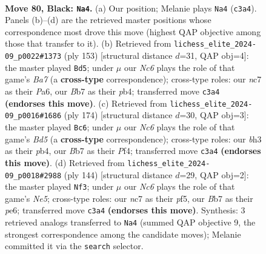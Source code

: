 \documentclass[11pt]{article}
\begin{document}
\clearpage

\begin{figure}[p]\centering
\begin{subfigure}{0.46\textwidth}\centering
\resizebox{\linewidth}{!}{%
\newchessgame
\chessboard[
  setfen={8/PbNR4/6k1/8/1p3P2/2n1K1PB/7P/8 b - - 29 80},
  showmover=false,
  pgfstyle=straightmove, color=movearrow, markmove={c3-a4}
]}
\caption{}
\end{subfigure}\hfill
\begin{subfigure}{0.46\textwidth}\centering
\resizebox{\linewidth}{!}{%
\newchessgame
\chessboard[
  setfen={4k3/6K1/p1p2P2/8/1P6/2BP4/b1P5/8 b - - 0 77},
  showmover=false,
  pgfstyle=straightmove, color=movearrow, markmove={a2-d5}
]}
\caption{}
\end{subfigure}
\\[4pt]
\begin{subfigure}{0.46\textwidth}\centering
\resizebox{\linewidth}{!}{%
\newchessgame
\chessboard[
  setfen={8/6kp/8/2pB1b2/1pP2P2/1r6/4K3/8 w - - 2 88},
  showmover=false,
  pgfstyle=straightmove, color=movearrow, markmove={d5-c6}
]}
\caption{}
\end{subfigure}\hfill
\begin{subfigure}{0.46\textwidth}\centering
\resizebox{\linewidth}{!}{%
\newchessgame
\chessboard[
  setfen={8/8/p3p3/4Np2/1k3P2/p1r5/8/1K6 w - - 6 73},
  showmover=false,
  pgfstyle=straightmove, color=movearrow, markmove={e5-f3}
]}
\caption{}
\end{subfigure}
\caption{\textbf{Move 80, Black: \texttt{Na4}.} (a) Our position; Melanie plays \texttt{Na4} (\texttt{c3a4}). Panels (b)--(d) are the retrieved master positions whose correspondence most drove this move (highest QAP objective among those that transfer to it). (b) Retrieved from \texttt{lichess\_elite\_2024-09\_p0022\#1373} (ply 153) [structural distance $d$=31, QAP obj=4]: the master played \texttt{Bd5}; under $\mu$ our \emph{Nc6} plays the role of that game's \emph{Ba7} (a \textbf{cross-type} correspondence); cross-type roles: our \emph{n}c7 as their \emph{P}a6, our \emph{B}b7 as their \emph{p}b4; transferred move \texttt{c3a4} \textbf{(endorses this move)}. (c) Retrieved from \texttt{lichess\_elite\_2024-09\_p0016\#1686} (ply 174) [structural distance $d$=30, QAP obj=3]: the master played \texttt{Bc6}; under $\mu$ our \emph{Nc6} plays the role of that game's \emph{Bd5} (a \textbf{cross-type} correspondence); cross-type roles: our \emph{b}h3 as their \emph{p}b4, our \emph{B}b7 as their \emph{P}f4; transferred move \texttt{c3a4} \textbf{(endorses this move)}. (d) Retrieved from \texttt{lichess\_elite\_2024-09\_p0018\#2988} (ply 144) [structural distance $d$=29, QAP obj=2]: the master played \texttt{Nf3}; under $\mu$ our \emph{Nc6} plays the role of that game's \emph{Ne5}; cross-type roles: our \emph{n}c7 as their \emph{p}f5, our \emph{B}b7 as their \emph{p}e6; transferred move \texttt{c3a4} \textbf{(endorses this move)}. Synthesis: 3 retrieved analogs transferred to \texttt{Na4} (summed QAP objective 9, the strongest correspondence among the candidate moves); Melanie committed it via the \texttt{search} selector.}
\label{fig:thought-m159}
\end{figure}
\end{document}
